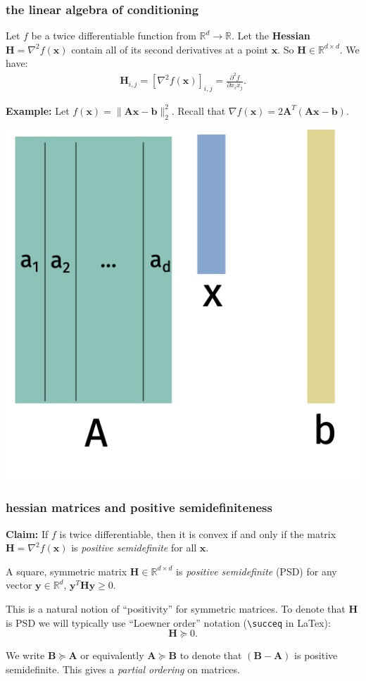 \documentclass[compress]{beamer}
\newcommand{\bv}[1]{\mathbf{#1}}
\newcommand{\R}{\mathbb{R}}
\begin{document}
\begin{frame}[t]
	\frametitle{the linear algebra of conditioning}
	Let $f$ be a twice differentiable function from $\R^d \rightarrow \R$. Let the \textbf{\alert{Hessian}} $\bv{H} = \nabla^2 f(\bv{x})$ contain all of its second derivatives at a point $\bv{x}$. So $\bv{H}\in \R^{d\times d}$.  We have:
	\begin{align*}
		\bv{H}_{i,j} = \left[\nabla^2 f(\bv{x})\right]_{i,j} = \frac{\partial^2 f}{\partial x_i x_j}. 
	\end{align*}
	
	\textbf{Example:}
	Let $f(\bv{x}) = \|\bv{A}\bv{x} - \bv{b}\|_2^2$. Recall that $\nabla f(\bv{x}) = 2\bv{A}^T(\bv{A}\bv{x}-\bv{b}).$
	
	\includegraphics[width=.4\textwidth]{regression.png}
\end{frame}

\begin{frame}[t]
	\frametitle{hessian matrices and positive semidefiniteness}
	\textbf{Claim:} If $f$ is twice differentiable, then it is convex if and only if the matrix $\bv{H} = \nabla^2 f(\bv{x})$ is \emph{positive semidefinite} for all $\bv{x}$. 
	
	\begin{definition}
		A square, symmetric matrix $\bv{H}\in \R^{d\times d}$ is \emph{positive semidefinite} (PSD) for any vector $\bv{y}\in \R^d$, $\bv{y}^T\bv{H}\bv{y} \geq 0$. 
	\end{definition}
	
	This is a natural notion of ``positivity'' for symmetric matrices. To denote that $\bv{H}$ is PSD we will typically use ``Loewner order'' notation (\texttt{\textbackslash succeq} in LaTex): $$\bv{H}\succeq 0.$$
	
	We write $\bv{B}\succeq \bv{A}$ or equivalently  $\bv{A}\succeq \bv{B}$ to denote that $(\bv{B} - \bv{A})$ is positive semidefinite. This gives a \emph{partial ordering} on matrices.
\end{frame}
\end{document}
